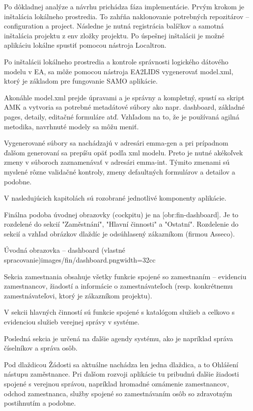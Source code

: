 Po dôkladnej analýze a návrhu prichádza fáza implementácie. Prvým krokom je inštalácia lokálneho prostredia. To zahŕňa naklonovanie potrebných repozitárov -- configuration a project. Následne je nutná registrácia balíčkov a samotná inštalácia projektu z env zložky projektu. Po úspešnej inštalácii je možné aplikáciu lokálne spustiť pomocou nástroja Localtron.

Po inštalácii lokálneho prostredia a kontrole správnosti logického dátového modelu v EA, sa môže pomocou nástroja EA2LIDS vygenerovať model.xml, ktorý je základom pre fungovanie SAMO aplikácie. 

Akonáhle model.xml prejde úpravami a je správny a kompletný, spustí sa skript AMK a vytvoria sa potrebné metadátové súbory ako napr. dashboard, základné pages, detaily, editačné formuláre atď. Vzhľadom na to, že je používaná agilná metodika, navrhnuté modely sa môžu meniť.

Vygenerované súbory sa nachádzajú v adresári emma-gen a pri prípadnom ďalšom generovaní sa prepíšu opäť podľa xml modelu. Preto je nutné akékoľvek zmeny v súboroch zaznamenávať v adresári emma-int. Týmito zmenami sú myslené rôzne validačné kontroly, zmeny defaultných formulárov a detailov a podobne.

V nasledujúcich kapitolách sú rozobrané jednotlivé komponenty aplikácie.

Finálna podoba úvodnej obrazovky (cockpitu) je na [obr:fin-dashboard]. Je to rozdelené do sekcií "Zaměstnání", "Hlavní činnosti" a "Ostatní". Rozdelenie do sekcií a vzhľad obrázkov dlaždíc je odsúhlasený zákazníkom (firmou Asseco).

{Úvodná obrazovka -- dashboard (vlastné spracovanie)}{images/fin/dashboard.png}{width=32cc}

Sekcia zamestnania obsahuje všetky funkcie spojené so zamestnaním -- evidenciu zamestnancov, žiadostí a informácie o zamestnávateľoch (resp. konkrétnemu zamestnávateľovi, ktorý je zákazníkom projektu). 

V sekcii hlavných činností sú funkcie spojené s katalógom služieb a celkovo s evidenciou služieb verejnej správy v systéme. 

Posledná sekcia je určená na ďalšie agendy systému, ako je napríklad správa číselníkov a správa osôb.


Pod dlaždicou Žádosti sa aktuálne nachádza len jedna dlaždica, a to Ohlášení nástupu zaměstnance. Pri ďalšom rozvoji aplikácie tu pribudnú ďalšie žiadosti spojené s verejnou správou, napríklad hromadné oznámenie zamestnancov, odchod zamestnanca, služby spojené so zamestnávaním osôb so zdravotným postihnutím a podobne.


